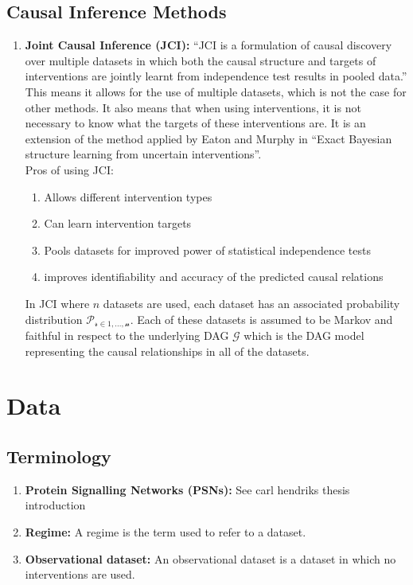 \documentclass[11pt]{article}
\begin{document}
\subsection{Causal Inference Methods}
\begin{enumerate}
    \item \textbf{Joint Causal Inference (JCI):} ``JCI is a formulation of causal discovery over multiple datasets in which both the causal structure and targets of interventions are jointly learnt from independence test results in pooled data.''\cite[p.~2]{jci} This means it allows for the use of multiple datasets, which is not the case for other methods. It also means that when using interventions, it is not necessary to know what the targets of these interventions are. It is an extension of the method applied by Eaton and Murphy in ``Exact Bayesian structure learning from uncertain interventions''.\cite[p.~2]{jci,eaton2007exact}\\
    
    
    Pros of using JCI:
    \begin{enumerate}
        \item Allows different intervention types
        \item Can learn intervention targets
        \item Pools datasets for improved power of statistical independence tests
        \item improves identifiability and accuracy of the predicted causal relations
    \end{enumerate}
    
    In JCI where $n$ datasets are used, each dataset has an associated probability distribution $\mathcal{P_{r\in1,...,n}}$. Each of these datasets is assumed to be Markov and faithful in respect to the underlying DAG $\mathcal{G}$ which is the DAG model representing the causal relationships in all of the datasets.
    
\end{enumerate}


\section{Data}
\subsection{Terminology}
\begin{enumerate}
    \item \textbf{Protein Signalling Networks (PSNs):} See carl hendriks thesis introduction
    \item \textbf{Regime:} A regime is the term used to refer to a dataset.
    \item \textbf{Observational dataset:} An observational dataset is a dataset in which no interventions are used.
\end{enumerate}

 
\end{document}
